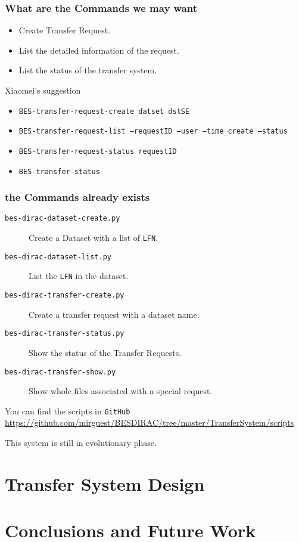 \documentclass[19pt]{beamer}
\begin{document}
\begin{frame}
    \frametitle{What are the Commands we may want}
    \begin{itemize}
        \item Create Transfer Request.
        \item List the detailed information of the request.
        \item List the status of the transfer system.
    \end{itemize}
    \begin{exampleblock}{Xiaomei's suggestion}
        \begin{itemize}
            \item {\tt BES-transfer-request-create datset dstSE}
            \item {\tt BES-transfer-request-list --requestID --user
                        --time\_create --status}
            \item {\tt BES-transfer-request-status requestID}
            \item {\tt BES-transfer-status}
        \end{itemize}
    \end{exampleblock}
\end{frame}

\begin{frame}
    \frametitle{the Commands already exists}
    \begin{description}
        \item[{\tt bes-dirac-dataset-create.py}]
            Create a Dataset with a list of {\tt LFN}.
        \item[{\tt bes-dirac-dataset-list.py}]
            List the {\tt LFN} in the dataset.
        \item[{\tt bes-dirac-transfer-create.py}]
            Create a transfer request with a dataset name.
        \item[{\tt bes-dirac-transfer-status.py}]
            Show the status of the Transfer Requests.
        \item[{\tt bes-dirac-transfer-show.py}]
            Show whole files associated with a special request.
    \end{description}
    \begin{block}{You can find the scripts in {\tt GitHub}}
        \url{https://github.com/mirguest/BESDIRAC/tree/master/TransferSystem/scripts}

        This system is still in evolutionary phase.
    \end{block}
\end{frame}

\section{Transfer System Design}

    

\section{Conclusions and Future Work}

    
\end{document}
